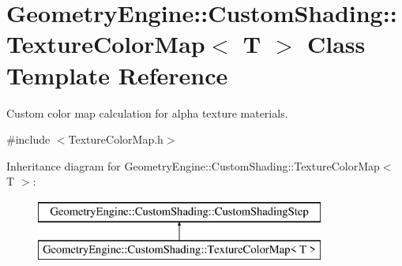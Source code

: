 \hypertarget{class_geometry_engine_1_1_custom_shading_1_1_texture_color_map}{}\section{Geometry\+Engine\+::Custom\+Shading\+::Texture\+Color\+Map$<$ T $>$ Class Template Reference}
\label{class_geometry_engine_1_1_custom_shading_1_1_texture_color_map}


Custom color map calculation for alpha texture materials.  




{\ttfamily \#include $<$Texture\+Color\+Map.\+h$>$}

Inheritance diagram for Geometry\+Engine\+::Custom\+Shading\+::Texture\+Color\+Map$<$ T $>$\+:\begin{figure}[H]
\begin{center}
\leavevmode
\includegraphics[height=2.000000cm]{class_geometry_engine_1_1_custom_shading_1_1_texture_color_map}
\end{center}
\end{figure}
